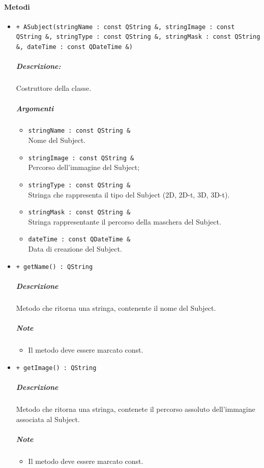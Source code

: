 	\paragraph{\color{black}Metodi}
		\begin{itemize}
			\item \color{blue} \verb!+ ASubject(stringName : const QString &, stringImage : const QString &, stringType : const QString &, stringMask : const QString &, dateTime : const QDateTime &)!
			\color{black}
			\subparagraph{Descrizione:} Costruttore della classe.
			\color{black}
			\subparagraph{Argomenti}
			\begin{itemize}
				\item \color{RoyalPurple} \verb!stringName : const QString &!\\				
\color{black} Nome del Subject\g{}.
				\item \color{RoyalPurple} \verb!stringImage : const QString &!\\				
\color{black} Percorso dell'immagine del Subject\g{};
				\item \color{RoyalPurple} \verb!stringType : const QString &!\\				
\color{black} Stringa che rappresenta il tipo del Subject\g{} (2D, 2D-t, 3D, 3D-t).
				\item \color{RoyalPurple} \verb!stringMask : const QString &!\\				
\color{black} Stringa rappresentante il percorso della maschera del Subject\g{}.
				\item \color{RoyalPurple} \verb!dateTime : const QDateTime &!\\				
\color{black} Data di creazione del Subject\g{}.
			\end{itemize}
			\item \color{blue} \verb!+ getName() : QString!
			\color{black}
			\subparagraph{Descrizione} Metodo che ritorna una stringa, contenente il nome del Subject\g{}.
			\subparagraph{Note}
			\begin{itemize}
				\item Il metodo deve essere marcato const.
			\end{itemize}
			\item \color{blue} \verb!+ getImage() : QString!
			\color{black}
			\subparagraph{Descrizione} Metodo che ritorna una stringa, contenete il percorso assoluto dell'immagine associata al Subject\g{}.
			\subparagraph{Note}
			\begin{itemize}
				\item Il metodo deve essere marcato const.

\end{itemize}
\end{itemize}
